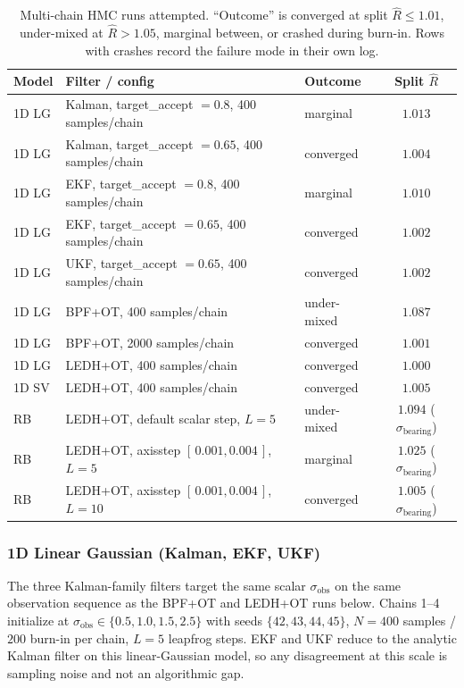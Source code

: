 \documentclass{article}
\begin{document}
\begin{table}[H]
\centering
\footnotesize
\caption{Multi-chain HMC runs attempted. ``Outcome'' is converged at split $\hat R \le 1.01$, under-mixed at $\hat R > 1.05$, marginal between, or crashed during burn-in. Rows with crashes record the failure mode in their own log.}
\label{tab:hmc_multichain_attempts}
\begin{tabular}{lllc}
\toprule
Model & Filter / config & Outcome & Split $\hat R$ \\
\midrule
1D LG & Kalman, target\_accept $= 0.8$, 400 samples/chain & marginal & $1.013$ \\
1D LG & Kalman, target\_accept $= 0.65$, 400 samples/chain & converged & $1.004$ \\
1D LG & EKF, target\_accept $= 0.8$, 400 samples/chain & marginal & $1.010$ \\
1D LG & EKF, target\_accept $= 0.65$, 400 samples/chain & converged & $1.002$ \\
1D LG & UKF, target\_accept $= 0.65$, 400 samples/chain & converged & $1.002$ \\
1D LG & BPF+OT, 400 samples/chain & under-mixed & $1.087$ \\
1D LG & BPF+OT, 2000 samples/chain & converged & $1.001$ \\
1D LG & LEDH+OT, 400 samples/chain & converged & $1.000$ \\
1D SV & LEDH+OT, 400 samples/chain & converged & $1.005$ \\
RB & LEDH+OT, default scalar step, $L=5$ & under-mixed & $1.094$ ($\sigma_{\text{bearing}}$) \\
RB & LEDH+OT, axisstep $[\,0.001, 0.004\,]$, $L=5$ & marginal & $1.025$ ($\sigma_{\text{bearing}}$) \\
RB & LEDH+OT, axisstep $[\,0.001, 0.004\,]$, $L=10$ & converged & $1.005$ ($\sigma_{\text{bearing}}$) \\
\bottomrule
\end{tabular}
\end{table}

\subsubsection{1D Linear Gaussian (Kalman, EKF, UKF)}
\label{sec:hmc-multichain-lg-kalman-family}

The three Kalman-family filters target the same scalar $\sigma_{\text{obs}}$ on the same observation sequence as the BPF+OT and LEDH+OT runs below. Chains 1--4 initialize at $\sigma_{\text{obs}} \in \{0.5, 1.0, 1.5, 2.5\}$ with seeds $\{42, 43, 44, 45\}$, $N = 400$ samples / $200$ burn-in per chain, $L = 5$ leapfrog steps. EKF and UKF reduce to the analytic Kalman filter on this linear-Gaussian model, so any disagreement at this scale is sampling noise and not an algorithmic gap.
\end{document}
